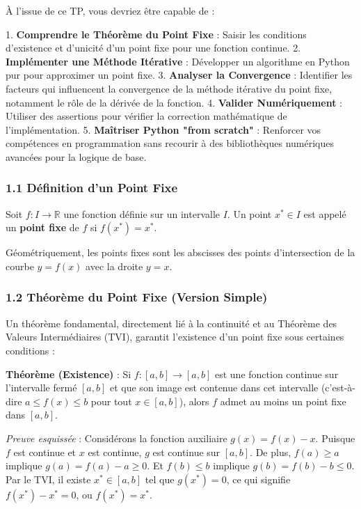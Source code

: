 \documentclass[12pt,a4paper]{report}
\begin{document}
À l'issue de ce TP, vous devriez être capable de :

1.  \textbf{Comprendre le Théorème du Point Fixe} : Saisir les conditions d'existence et d'unicité d'un point fixe pour une fonction continue.
2.  \textbf{Implémenter une Méthode Itérative} : Développer un algorithme en Python pur pour approximer un point fixe.
3.  \textbf{Analyser la Convergence} : Identifier les facteurs qui influencent la convergence de la méthode itérative du point fixe, notamment le rôle de la dérivée de la fonction.
4.  \textbf{Valider Numériquement} : Utiliser des assertions pour vérifier la correction mathématique de l'implémentation.
5.  \textbf{Maîtriser Python "from scratch"} : Renforcer vos compétences en programmation sans recourir à des bibliothèques numériques avancées pour la logique de base.


\subsubsection{1.1 Définition d'un Point Fixe}

Soit $f: I \to \mathbb{R}$ une fonction définie sur un intervalle $I$. Un point $x^* \in I$ est appelé un \textbf{point fixe} de $f$ si $f(x^*) = x^*$.

Géométriquement, les points fixes sont les abscisses des points d'intersection de la courbe $y = f(x)$ avec la droite $y = x$.

\subsubsection{1.2 Théorème du Point Fixe (Version Simple)}

Un théorème fondamental, directement lié à la continuité et au Théorème des Valeurs Intermédiaires (TVI), garantit l'existence d'un point fixe sous certaines conditions :

\textbf{Théorème (Existence)} : Si $f: [a, b] \to [a, b]$ est une fonction continue sur l'intervalle fermé $[a, b]$ et que son image est contenue dans cet intervalle (c'est-à-dire $a \le f(x) \le b$ pour tout $x \in [a, b]$), alors $f$ admet au moins un point fixe dans $[a, b]$.

\textit{Preuve esquissée} : Considérons la fonction auxiliaire $g(x) = f(x) - x$.
Puisque $f$ est continue et $x$ est continue, $g$ est continue sur $[a, b]$.
De plus, $f(a) \ge a$ implique $g(a) = f(a) - a \ge 0$.
Et $f(b) \le b$ implique $g(b) = f(b) - b \le 0$.
Par le TVI, il existe $x^* \in [a, b]$ tel que $g(x^*) = 0$, ce qui signifie $f(x^*) - x^* = 0$, ou $f(x^*) = x^*$.
\end{document}
